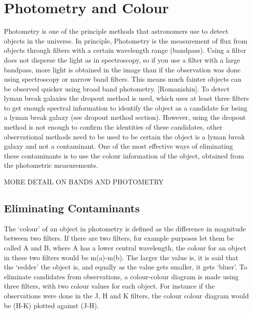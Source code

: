 
\section{Photometry and Colour} %
\label{section:Photometry_Colour}
	Photometry is one of the principle methods that astronomers use to detect objects in the universe. In principle, Photometry is the measurement of flux from objects through filters with a certain wavelength range (bandpass). Using a filter does not disperse the light as in spectroscopy, so if you use a filter with a large bandpass, more light is obtained in the image than if the observation was done using spectroscopy or narrow band filters. This means much fainter objects can be observed quicker using broad band photometry. [Romanishin]. To detect lyman break galaxies the dropout method is used, which uses at least three filters to get enough spectral information to identify the object as a candidate for being a lyman break galaxy (see dropout method section). However,  using the dropout method is not enough to confirm the identities of these candidates, other observational methods need to be used to be certain the object is a lyman break galaxy and not a contaminant. One of the most effective ways of eliminating these contaminants is to use the colour information of the object, obtained from the photometric measurements.

	MORE DETAIL ON BANDS AND PHOTOMETRY

    \subsection{Eliminating Contaminants} %
    \label{sub:Eliminating_Contanimants}
		The ‘colour’ of an object in photometry is defined as the difference in magnitude between two filters. If there are two filters, for example purposes let them be called A and B, where A has a lower central wavelength, the colour for an object in these two filters would be  m(a)-m(b). The larger the value is, it is said that the ‘redder’ the object is, and equally as the value gets smaller, it gets ‘bluer’. To eliminate candidates from observations, a colour-colour diagram is made using three filters, with two colour values for each object. For instance if the observations were done in the J, H and K filters, the colour colour diagram would be (H-K) plotted against (J-H). 


